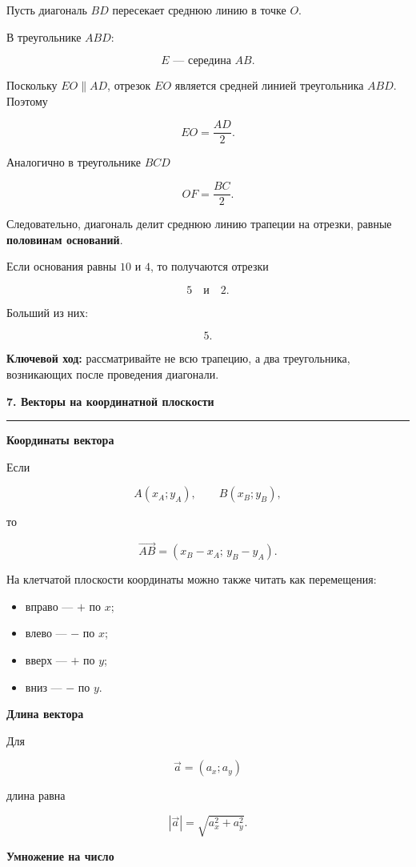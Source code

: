 \documentclass[a4paper,12pt]{article}
\newcommand{\topic}[1]{%
  \vspace{0.8em}
  {\Large\bfseries\textcolor{darkaccent}{#1}}\par
  \vspace{0.25em}
  {\color{accent}\rule{\linewidth}{0.6pt}}
  \vspace{0.45em}
}
\newcommand{\subtopic}[1]{%
  \vspace{0.45em}
  {\large\bfseries\textcolor{accent}{#1}}\par
  \vspace{0.2em}
}
\newcommand{\key}[1]{\textcolor{darkaccent}{\textbf{#1}}}
\newcommand{\vect}[1]{\overrightarrow{#1}}
\begin{document}
Пусть диагональ \(BD\) пересекает среднюю линию в точке \(O\).

В треугольнике \(ABD\):

\[
E \text{ --- середина } AB.
\]

Поскольку \(EO\parallel AD\), отрезок \(EO\) является средней линией треугольника \(ABD\). Поэтому

\[
\boxed{
EO=\frac{AD}{2}.
}
\]

Аналогично в треугольнике \(BCD\)

\[
\boxed{
OF=\frac{BC}{2}.
}
\]

Следовательно, диагональ делит среднюю линию трапеции на отрезки, равные \key{половинам оснований}.

Если основания равны \(10\) и \(4\), то получаются отрезки

\[
5
\quad\text{и}\quad
2.
\]

Больший из них:

\[
\boxed{5}.
\]

\key{Ключевой ход:}
рассматривайте не всю трапецию, а два треугольника, возникающих после проведения диагонали.


\topic{7. Векторы на координатной плоскости}

\subtopic{Координаты вектора}

Если

\[
A(x_A;y_A),
\qquad
B(x_B;y_B),
\]

то

\[
\boxed{
\vect{AB}
=
(x_B-x_A;\,y_B-y_A).
}
\]

На клетчатой плоскости координаты можно также читать как перемещения:

\begin{itemize}
  \item вправо --- \(+\) по \(x\);
  \item влево --- \(-\) по \(x\);
  \item вверх --- \(+\) по \(y\);
  \item вниз --- \(-\) по \(y\).
\end{itemize}

\subtopic{Длина вектора}

Для

\[
\vec a=(a_x;a_y)
\]

длина равна

\[
\boxed{
|\vec a|
=
\sqrt{a_x^2+a_y^2}.
}
\]

\subtopic{Умножение на число}
\end{document}
